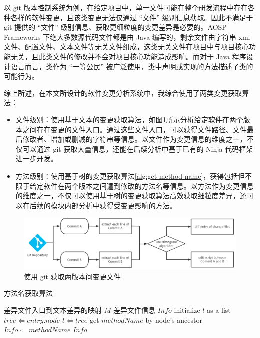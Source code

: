 以 git 版本控制系统为例，在给定项目中，单一文件可能在整个研发流程中存在各种各样的软件变更，且该类变更无法仅通过 “文件” 级别信息获取。因此不满足于 git 提供的 “文件” 级别信息、获取更细粒度的变更差异是必要的。AOSP Frameworks 下绝大多数源代码文件都是由 Java 编写的，剩余文件由字符串 xml 文件、配置文件、文本文件等无关文件组成，这类无关文件在项目中与项目核心功能无关，且此类文件的修改并不会对项目核心功能造成影响。而对于 Java 程序设计语言而言，类作为 “一等公民” 被广泛使用，类中声明或实现的方法描述了类的可能行为。

综上所述，在本文所设计的软件变更分析系统中，我综合使用了两类变更获取算法：

\begin{itemize}
    \item 文件级别：使用基于文本的变更获取算法，如图\ref{fig:git-alg}所示分析给定软件在两个版本之间存在变更的文件入口。通过这些文件入口，可以获得文件路径、文件最后修改者、增加或删减的字符串等信息。以文件作为变更信息的维度之一，不仅可以通过 git 获取大量信息，还能在后续分析中基于已有的 Ninja 代码框架进一步开发。
    \item 方法级别：使用基于树的变更获取算法\ref{alg:get-method-name}，获得包括但不限于给定软件在两个版本之间遭到修改的方法名等信息。以方法作为变更信息的维度之一，不仅可以使用基于树的变更获取算法高效获取细粒度差异，还可以在后续的模块内部分析中获得受变更影响的方法。

\end{itemize}

\begin{figure}
    \centering
    \includegraphics[width=.8\textwidth]{figures/git-alg.png}
    \caption{使用 git 获取两版本间变更文件}
    \label{fig:git-alg}
\end{figure}

\vskip 13.8pt
\renewcommand{\thealgorithm}{1}
    \begin{algorithm}
        \caption{方法名获取算法}
        \begin{algorithmic}[1]
            \Require 差异文件入口到文本差异的映射 $M$
            \Ensure 差异文件信息 $Info$
            \State initialize $l$ as a list
                \State $tree \Leftarrow entry.node$
                    \State $l \Leftarrow tree$
                \EndIf
            \EndFor
                \State get $methodName$ by node's ancestor
                \State $Info \Leftarrow methodName$
            \EndFor
            \State \Return $Info$
        \end{algorithmic}
        \label{alg:get-method-name}
    \end{algorithm}
    \vskip 13.8pt
